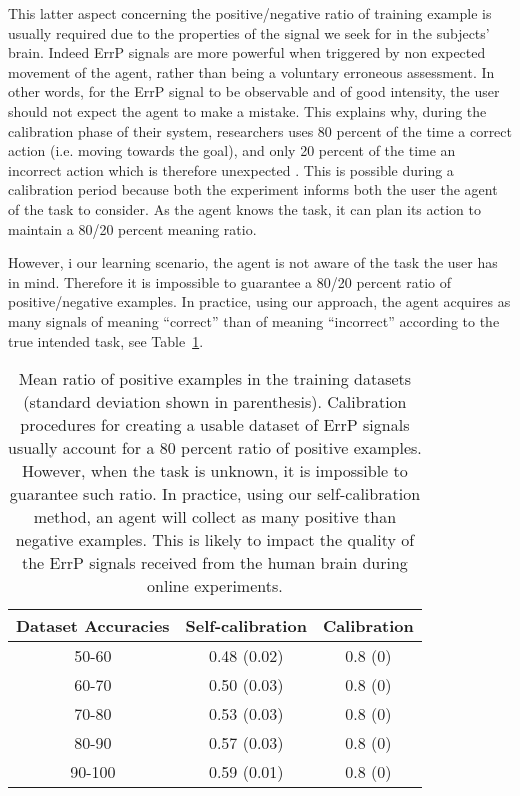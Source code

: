 This latter aspect concerning the positive/negative ratio of training example is usually required due to the properties of the signal we seek for in the subjects' brain. Indeed ErrP signals are more powerful when triggered by non expected movement of the agent, rather than being a voluntary erroneous assessment. In other words, for the ErrP signal to be observable and of good intensity, the user should not expect the agent to make a mistake. This explains why, during the calibration phase of their system, researchers uses 80 percent of the time a correct action (i.e. moving towards the goal), and only 20 percent of the time an incorrect action which is therefore unexpected \cite{chavarriaga2014errare}. This is possible during a calibration period because both the experiment informs both the user the agent of the task to consider. As the agent knows the task, it can plan its action to maintain a 80/20 percent meaning ratio.

However, i our learning scenario, the agent is not aware of the task the user has in mind. Therefore it is impossible to guarantee a 80/20 percent ratio of positive/negative examples. In practice, using our approach, the agent acquires as many signals of meaning ``correct'' than of meaning ``incorrect'' according to the true intended task, see Table~\ref{tab:correctLabelRatio}.

\begin{table}
\centering
{}
\begin{tabular}{c c c}
Dataset Accuracies & Self-calibration & Calibration \\ \hline
50-60 & 0.48 (0.02) & 0.8 (0) \\
60-70 & 0.50 (0.03) & 0.8 (0) \\
70-80 & 0.53 (0.03) & 0.8 (0) \\
80-90 & 0.57 (0.03) & 0.8 (0) \\
90-100 & 0.59 (0.01) & 0.8 (0) \\
\end{tabular}
\caption{Mean ratio of positive examples in the training datasets (standard deviation shown in parenthesis). Calibration procedures for creating a usable dataset of ErrP signals usually account for a 80 percent ratio of positive examples. However, when the task is unknown, it is impossible to guarantee such ratio. In practice, using our self-calibration method, an agent will collect as many positive than negative examples. This is likely to impact the quality of the ErrP signals received from the human brain during online experiments.}
\label{tab:correctLabelRatio}
\end{table}

